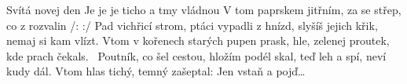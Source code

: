 \begin{TEXT}{Svítá novej den}
\SLOKA[]   
\SLOKA Je  je  \NL
je  ticho a tmy vládnou \NL
V tom paprskem jitřním, \NL
za se střep, co z rozvalin \NL
\REFREN  /:   :/
\SLOKA Pad vichřicí strom, ptáci vypadli z hnízd,\NL
slyšíš jejich křik, nemaj si kam vlízt.\NL
Vtom v kořenech starých pupen prask,\NL
hle, zelenej proutek, kde prach čekals.  
\REFREN \,
\SLOKA Poutník, co šel cestou, hložím podél skal,\NL
teď leh a spí, neví kudy dál.\NL
Vtom hlas tichý, temný zašeptal:\NL
Jen vstaň a pojď…   
\REFREN \,
\end{TEXT}
